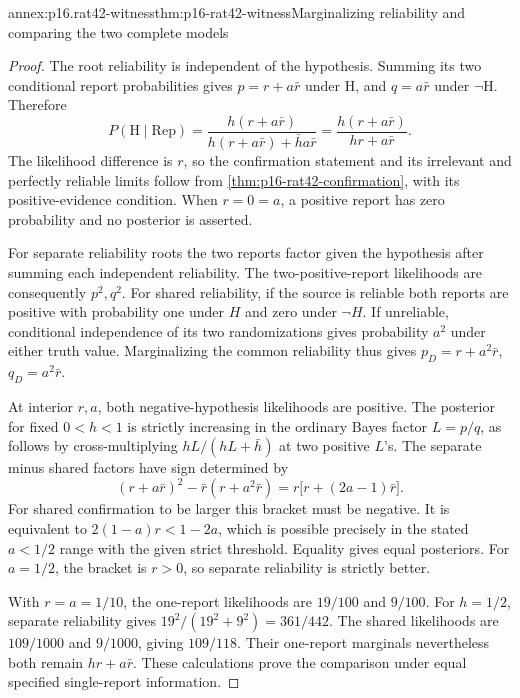 \begin{annexitem}{annex:p16.rat42-witness}{thm:p16-rat42-witness}{Marginalizing reliability and comparing the two complete models}
\begin{proof}
The root reliability is independent of the hypothesis. Summing
its two conditional report probabilities gives
\(p=r+a\bar r\) under \(\mathrm H\), and
\(q=a\bar r\) under \(\neg\mathrm H\). Therefore
\[
 P(\mathrm H\mid\mathrm{Rep})
  =\frac{h(r+a\bar r)}{h(r+a\bar r)+\bar h a\bar r}
  =\frac{h(r+a\bar r)}{hr+a\bar r}.
\]
The likelihood difference is \(r\), so the confirmation statement
and its irrelevant and perfectly reliable limits follow from
\cref{thm:p16-rat42-confirmation}, with its positive-evidence condition.
When \(r=0=a\), a positive report has zero probability and no
posterior is asserted.

For separate reliability roots the two reports factor given
the hypothesis after summing each independent reliability.
The two-positive-report likelihoods are consequently \(p^2,q^2\).
For shared reliability, if the source is reliable both reports
are positive with probability one under \(H\) and zero under
\(\neg H\). If unreliable, conditional independence of its
two randomizations gives probability \(a^2\) under either truth
value. Marginalizing the common reliability thus gives
\(p_D=r+a^2\bar r\), \(q_D=a^2\bar r\).

At interior \(r,a\), both negative-hypothesis likelihoods are
positive. The posterior for fixed \(0<h<1\) is strictly
increasing in the ordinary Bayes factor \(L=p/q\), as follows
by cross-multiplying \(hL/(hL+\bar h)\) at two positive \(L\)'s.
The separate minus shared factors have sign determined by
\[
 (r+a\bar r)^2-\bar r(r+a^2\bar r)
             =r\bigl[r+(2a-1)\bar r\bigr].
\]
For shared confirmation to be larger this bracket must be negative.
It is equivalent to
\(2(1-a)r<1-2a\), which is possible precisely in the stated
\(a<1/2\) range with the given strict threshold. Equality
gives equal posteriors. For \(a=1/2\), the bracket is \(r>0\),
so separate reliability is strictly better.

With \(r=a=1/10\), the one-report likelihoods are \(19/100\)
and \(9/100\). For \(h=1/2\), separate reliability gives
\(19^2/(19^2+9^2)=361/442\). The shared likelihoods are
\(109/1000\) and \(9/1000\), giving \(109/118\).
Their one-report marginals nevertheless both remain
\(hr+a\bar r\). These calculations prove the comparison
under equal specified single-report information.
\end{proof}
\end{annexitem}

